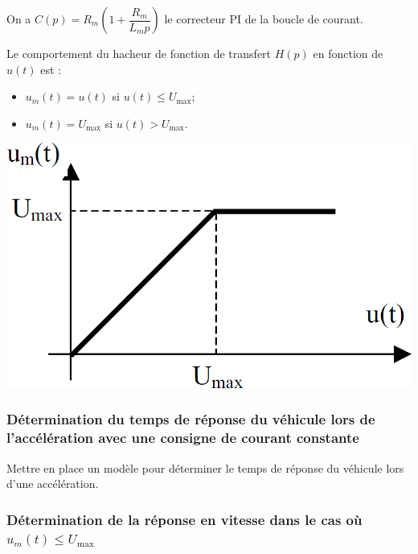 \documentclass[10pt,fleqn]{article} %
\begin{document}
\begin{multicols}{2}
On a $C(p)=R_m\left( 1+\dfrac{R_m}{L_m p}\right)$ le correcteur PI de la boucle de courant.

\begin{minipage}[c]{.65\linewidth}
Le comportement du hacheur de fonction de transfert $H(p)$ en fonction de $u(t)$ est :
\begin{itemize}
\item $u_m(t) = u(t)$ si $u (t) \leq U_{\text{max}}$;
\item $u_m(t) = U_{\text{max}}$ si $u (t) > U_{\text{max}}$.
\end{itemize}
\end{minipage} \hfill
\begin{minipage}[c]{.3\linewidth}
\begin{center}
\includegraphics[width=\linewidth]{images/ccmp_02}
\end{center}
\end{minipage}

\subsubsection*{Détermination du temps de réponse du véhicule lors de l’accélération avec une consigne de courant constante}

\begin{obj}
Mettre en place un modèle pour déterminer le temps de réponse du véhicule lors d’une accélération.
\end{obj}

\subsubsection*{Détermination de la réponse en vitesse dans le cas où $u_m(t) \leq U_{\text{max}}$}


\end{multicols}
\end{document}
